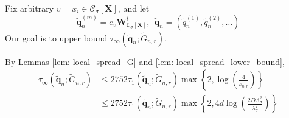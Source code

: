 \documentclass{article}
\newcommand{\1}{\mathbf{1}}
\newcommand{\qbf}{\mathbf{q}}
\newcommand{\Xbf}{\mathbf{X}}
\newcommand{\Wbf}{\mathbf{W}}
\newcommand{\Cset}{\mathcal{C}}
\newcommand{\Csig}{\Cset_{\sigma}}
\theoremstyle{aldenthm}
\begin{document}
Fix arbitrary $v = x_i \in \Csig[\Xbf]$, and let
\begin{equation*}
\widetilde{\qbf}_n^{(m)} = e_v \Wbf_{\Csig[\Xbf]}^t, ~~ \widetilde{\qbf}_n = (\widetilde{q}_n^{(1)}, \widetilde{q}_n^{(2)}, \ldots)
\end{equation*}
Our goal is to upper bound $\tau_{\infty}(\widetilde{\qbf}_n; \widetilde{G}_{n,r})$.

By Lemmas \ref{lem: local_spread_G} and \ref{lem: local_spread_lower_bound},
\begin{align*}
\tau_{\infty}(\widetilde{\qbf}_n; \widetilde{G}_{n,r}) & \leq 2752 \tau_{1}(\widetilde{\qbf}_n; \widetilde{G}_{n,r}) \max\left\{2, \log\left(\frac{4}{\widetilde{s}_{n,r}}\right) \right\} \nonumber \\
& \leq 2752 \tau_{1}(\widetilde{\qbf}_n; \widetilde{G}_{n,r}) \max\left\{2, 4d\log\left(\frac{2D \Lambda_{\sigma}^2}{\lambda_{\sigma}^2}\right) \right\}
\end{align*} 
\end{document}

